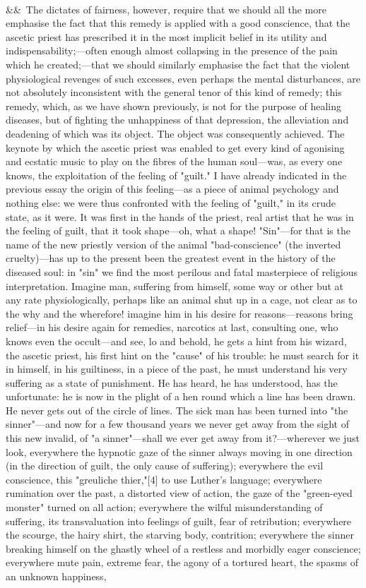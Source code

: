 \documentclass[12pt]{article}
\newcommand{\para}[1][]{\par\noindent\ifx&#1&\else\textsuperscript{\footnotesize #1}~\fi}
\begin{document}
\para The dictates of fairness, however, require that we should all the more emphasise the fact that this remedy is applied with a good conscience, that the ascetic priest has prescribed it in the most implicit belief in its utility and indispensability;---often enough almost collapsing in the presence of the pain which he created;---that we should similarly emphasise the fact that the violent physiological revenges of such excesses, even perhaps the mental disturbances, are not absolutely inconsistent with the general tenor of this kind of remedy; this remedy, which, as we have shown previously, is not for the purpose of healing diseases, but of fighting the unhappiness of that depression, the alleviation and deadening of which was its object. The object was consequently achieved. The keynote by which the ascetic priest was enabled to get every kind of agonising and ecstatic music to play on the fibres of the human soul---was, as every one knows, the exploitation of the feeling of "guilt." I have already indicated in the previous essay the origin of this feeling---as a piece of animal psychology and nothing else: we were thus confronted with the feeling of "guilt," in its crude state, as it were. It was first in the hands of the priest, real artist that he was in the feeling of guilt, that it took shape---oh, what a shape! "Sin"---for that is the name of the new priestly version of the animal "bad-conscience" (the inverted cruelty)---has up to the present been the greatest event in the history of the diseased soul: in "sin" we find the most perilous and fatal masterpiece of religious interpretation. Imagine man, suffering from himself, some way or other but at any rate physiologically, perhaps like an animal shut up in a cage, not clear as to the why and the wherefore! imagine him in his desire for reasons---reasons bring relief---in his desire again for remedies, narcotics at last, consulting one, who knows even the occult---and see, lo and behold, he gets a hint from his wizard, the ascetic priest, his first hint on the "cause" of his trouble: he must search for it in himself, in his guiltiness, in a piece of the past, he must understand his very suffering as a state of punishment. He has heard, he has understood, has the unfortunate: he is now in the plight of a hen round which a line has been drawn. He never gets out of the circle of lines. The sick man has been turned into "the sinner"---and now for a few thousand years we never get away from the sight of this new invalid, of "a sinner"---shall we ever get away from it?---wherever we just look, everywhere the hypnotic gaze of the sinner always moving in one direction (in the direction of guilt, the only cause of suffering); everywhere the evil conscience, this "greuliche thier,"[4] to use Luther's language; everywhere rumination over the past, a distorted view of action, the gaze of the "green-eyed monster" turned on all action; everywhere the wilful misunderstanding of suffering, its transvaluation into feelings of guilt, fear of retribution; everywhere the scourge, the hairy shirt, the starving body, contrition; everywhere the sinner breaking himself on the ghastly wheel of a restless and morbidly eager conscience; everywhere mute pain, extreme fear, the agony of a tortured heart, the spasms of an unknown happiness, 
\end{document}
